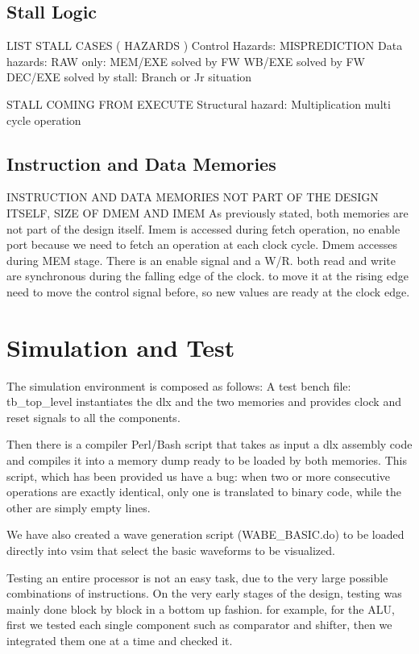 \documentclass[12pt]{article}
\begin{document}
\subsection{Stall Logic}
LIST STALL CASES ( HAZARDS )
Control Hazards: MISPREDICTION
Data hazards: RAW only:
MEM/EXE solved by FW
WB/EXE solved by FW
DEC/EXE solved by stall: Branch or Jr situation

STALL COMING FROM EXECUTE
Structural hazard: Multiplication multi cycle operation

\subsection{Instruction and Data Memories}
INSTRUCTION AND DATA MEMORIES NOT PART OF THE DESIGN ITSELF, SIZE OF DMEM AND IMEM
As previously stated, both memories are not part of the design itself.
Imem is accessed during fetch operation, no enable port because we need to fetch an operation at each clock cycle.
Dmem accesses during MEM stage. There is an enable signal and a W/R. both read and write are synchronous during the falling edge of the clock. to move it at the rising edge need to move the control signal before, so new values are ready at the clock edge.


\section{Simulation and Test}\label{Conclusions}
The simulation environment is composed as follows:
A test bench file: tb\_top\_level instantiates the dlx and the two memories and provides clock and reset signals to all the components.

Then there is a compiler Perl/Bash script that takes as input a dlx assembly code and compiles it into a memory dump ready to be loaded by both memories.
This script, which has been provided us have a bug: when two or more consecutive operations are exactly identical, only one is translated to binary code, while the other are simply empty lines.

We have also created a wave generation script (WABE\_BASIC.do) to be loaded directly into vsim that select the basic waveforms to be visualized.

Testing an entire processor is not an easy task, due to the very large possible combinations of instructions.
On the very early stages of the design, testing was mainly done block by block in a bottom up fashion. for example, for the ALU, first we tested each single component such as comparator and shifter, then we integrated them one at a time and checked it.
\end{document}
